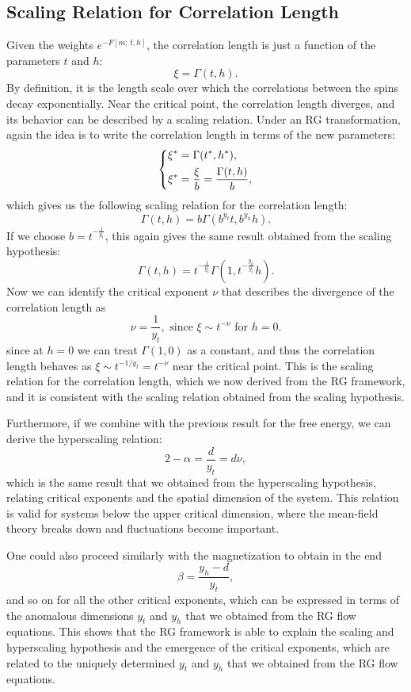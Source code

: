 \subsection{Scaling Relation for Correlation Length}

Given the weights \(e^{-F[m;\,t,h]}\), the correlation length is just a function of the parameters \(t\) and \(h\):
\[
    \xi = \Gamma(t,h).
\]
By definition, it is the length scale over which the correlations between the spins decay exponentially. Near the critical point, the correlation length diverges, and its behavior can be described by a scaling relation. Under an RG transformation, again the idea is to write the correlation length in terms of the new parameters:
\[
    \begin{dcases}
        \xi^* = \Gamma(t^*, h^*), \\
        \xi^* = \frac{\xi}{b} = \frac{\Gamma(t,h)}{b},
    \end{dcases}
\]
which gives us the following scaling relation for the correlation length:
\[
    \Gamma(t,h) = b \Gamma(b^{y_t} t, b^{y_h} h).
\]
If we choose \(b = t^{-\frac{1}{y_t}}\), this again gives the same result obtained from the scaling hypothesis:
\[
    \Gamma(t,h) = t^{-\frac{1}{y_t}} \Gamma(1, t^{-\frac{y_h}{y_t}} h).
\]
Now we can identify the critical exponent \(\nu\) that describes the divergence of the correlation length as
\[
    \nu = \frac{1}{y_t}, \text{ since } \xi \sim t^{-\nu} \text{ for } h = 0.
\]
since at \(h=0\) we can treat \(\Gamma(1,0)\) as a constant, and thus the correlation length behaves as \(\xi \sim t^{-1/y_t} = t^{-\nu}\) near the critical point. This is the scaling relation for the correlation length, which we now derived from the RG framework, and it is consistent with the scaling relation obtained from the scaling hypothesis.

Furthermore, if we combine with the previous result for the free energy, we can derive the hyperscaling relation:
\[
    2 - \alpha = \frac{d}{y_t} = d \nu,
\]
which is the same result that we obtained from the hyperscaling hypothesis, relating critical exponents and the spatial dimension of the system. This relation is valid for systems below the upper critical dimension, where the mean-field theory breaks down and fluctuations become important.

One could also proceed similarly with the magnetization to obtain in the end
\[
    \beta = \frac{y_h - d}{y_t},
\]
and so on for all the other critical exponents, which can be expressed in terms of the anomalous dimensions \(y_t\) and \(y_h\) that we obtained from the RG flow equations. This shows that the RG framework is able to explain the scaling and hyperscaling hypothesis and the emergence of the critical exponents, which are related to the uniquely determined \(y_t\) and \(y_h\) that we obtained from the RG flow equations.


